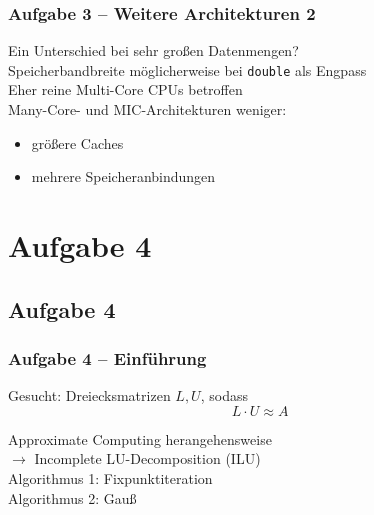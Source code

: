 \documentclass[german,notes,18pt]{beamer}
\begin{document}
	\begin{frame}
		\frametitle{Aufgabe 3 -- Weitere Architekturen 2}
		
		Ein Unterschied bei sehr großen Datenmengen? \\ \vspace{2em}
		Speicherbandbreite möglicherweise bei \texttt{double} als Engpass \\ 
		Eher reine Multi-Core CPUs betroffen \\
		Many-Core- und MIC-Architekturen weniger:
		\begin{itemize}
			\item größere Caches \\
			\item mehrere Speicheranbindungen 
		\end{itemize}

	\end{frame}

	\section{Aufgabe 4}
	\subsection{Aufgabe 4}

	\begin{frame}
		\frametitle{Aufgabe 4 -- Einführung}

		Gesucht: Dreiecksmatrizen $L,U$, sodass
		\begin{equation*}
			L\cdot U\approx A
		\end{equation*}

		\vspace{1em}

		Approximate Computing herangehensweise \\
		\hspace{2em} $\rightarrow$ Incomplete LU-Decomposition (ILU) \\
		
		\vspace{2em}
		Algorithmus 1: Fixpunktiteration \\
		Algorithmus 2: Gauß


	\end{frame}
\end{document}
